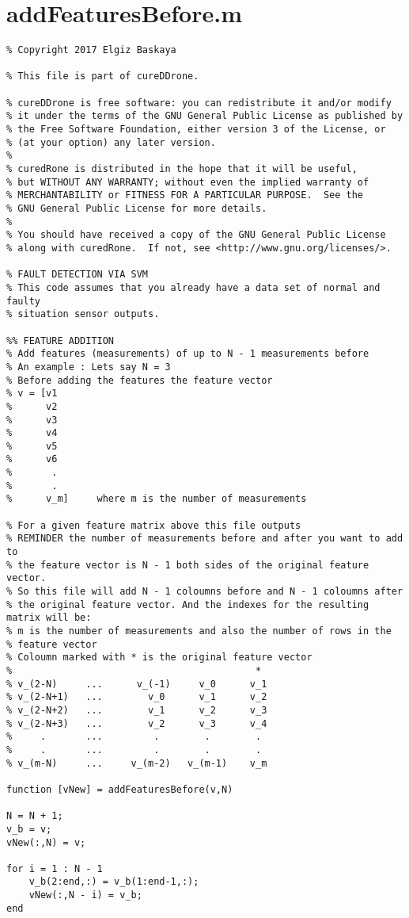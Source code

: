    \section{addFeaturesBefore.m}
\begin{lstlisting}
% Copyright 2017 Elgiz Baskaya

% This file is part of cureDDrone.

% cureDDrone is free software: you can redistribute it and/or modify
% it under the terms of the GNU General Public License as published by
% the Free Software Foundation, either version 3 of the License, or
% (at your option) any later version.
% 
% curedRone is distributed in the hope that it will be useful,
% but WITHOUT ANY WARRANTY; without even the implied warranty of
% MERCHANTABILITY or FITNESS FOR A PARTICULAR PURPOSE.  See the
% GNU General Public License for more details.
% 
% You should have received a copy of the GNU General Public License
% along with curedRone.  If not, see <http://www.gnu.org/licenses/>.

% FAULT DETECTION VIA SVM
% This code assumes that you already have a data set of normal and faulty 
% situation sensor outputs.

%% FEATURE ADDITION
% Add features (measurements) of up to N - 1 measurements before
% An example : Lets say N = 3
% Before adding the features the feature vector 
% v = [v1 
%      v2
%      v3 
%      v4
%      v5
%      v6
%       .
%       .
%      v_m]     where m is the number of measurements

% For a given feature matrix above this file outputs 
% REMINDER the number of measurements before and after you want to add to
% the feature vector is N - 1 both sides of the original feature vector.
% So this file will add N - 1 coloumns before and N - 1 coloumns after 
% the original feature vector. And the indexes for the resulting matrix will be: 
% m is the number of measurements and also the number of rows in the
% feature vector
% Coloumn marked with * is the original feature vector
%                                           *    
% v_(2-N)     ...      v_(-1)     v_0      v_1  
% v_(2-N+1)   ...        v_0      v_1      v_2 
% v_(2-N+2)   ...        v_1      v_2      v_3
% v_(2-N+3)   ...        v_2      v_3      v_4
%     .       ...         .        .        . 
%     .       ...         .        .        .
% v_(m-N)     ...     v_(m-2)   v_(m-1)    v_m

function [vNew] = addFeaturesBefore(v,N) 

N = N + 1;
v_b = v;
vNew(:,N) = v;

for i = 1 : N - 1
    v_b(2:end,:) = v_b(1:end-1,:);
    vNew(:,N - i) = v_b;
end
 \end{lstlisting}

